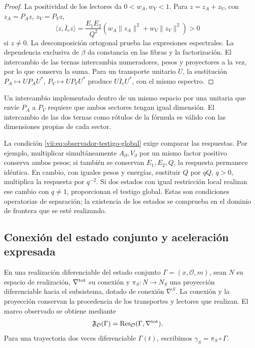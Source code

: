 \begin{proof}
La positividad de los lectores da \(0<w_A,w_V<1\). Para
\(z=z_A+z_V\), con \(z_A=P_Az\), \(z_V=P_Vz\),
\[
 \langle z,\overline I_vz\rangle
 =\frac{E_1E_2}{Q^2}
   (w_A\|z_A\|^2+w_V\|z_V\|^2)>0
\]
si \(z\neq0\). La descomposición ortogonal prueba las expresiones
espectrales. La dependencia exclusiva de \(\beta\) da constancia
en las fibras y la factorización. El intercambio de las ternas
intercambia numeradores, pesos y proyectores a la vez, por lo que
conserva la suma. Para un transporte unitario \(U\), la sustitución
\(P_A\mapsto UP_AU^*\), \(P_V\mapsto UP_VU^*\) produce
\(U\overline I_vU^*\), con el mismo espectro.
\end{proof}

Un intercambio implementado dentro de un mismo espacio por una unitaria
que envíe \(P_A\) a \(P_V\) requiere que ambos sectores tengan
igual dimensión. El intercambio de las dos ternas como rótulos de la
fórmula es válido con las dimensiones propias de cada sector.

La condición \eqref{vii:eq:observador-testigo-global} exige comparar
las respuestas. Por ejemplo, multiplicar simultáneamente
\(A_\partial,V_\partial\) por un mismo factor positivo conserva
ambos pesos; si también se conservan \(E_1,E_2,Q\), la respuesta
permanece idéntica. En cambio, con iguales pesos y energías, sustituir
\(Q\) por \(qQ\), \(q>0\), multiplica la respuesta por \(q^{-2}\).
Si dos estados con igual restricción local realizan ese cambio con
\(q\neq1\), proporcionan el testigo global. Estas son condiciones
operatorias de separación; la existencia de los estados se comprueba
en el dominio de frontera que se esté realizando.

\subsection{Conexión del estado conjunto y aceleración expresada}
\label{vii:sec:observador-autoinercia}

En una realización diferenciable del estado conjunto
\(\Gamma=(x,\mathcal O,m)\), sean \(N\) su espacio de realización,
\(\nabla^{\rm tot}\) su conexión y \(\pi_S:N\to N_S\) una
proyección diferenciable hacia el subsistema, dotado de conexión
\(\nabla^S\). La conexión y la proyección conservan la procedencia
de los transportes y lectores que realizan. El marco observado se
obtiene mediante
\[
 \mathfrak F_{\mathcal O}(\Gamma)
 =\operatorname{Res}_{\mathcal O}(\Gamma,\nabla^{\rm tot}).
\]
Para una trayectoria dos veces diferenciable \(\Gamma(t)\),
escribimos \(\gamma_S=\pi_S\circ\Gamma\).

